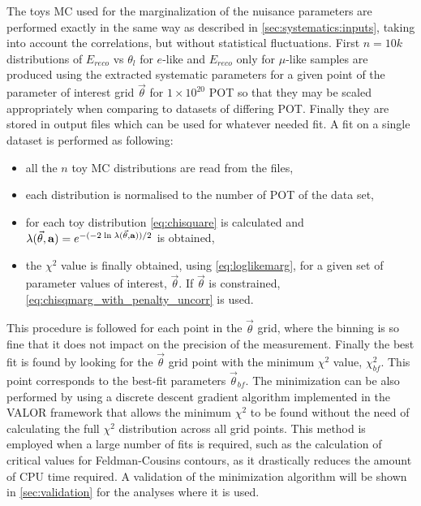 The toys MC used for the marginalization of the nuisance parameters are performed exactly in the same way as 
described in \cref{sec:systematics:inputs}, taking into account the correlations, but without statistical fluctuations.
First $n = 10k$ distributions of $E_{reco}$ vs $\theta_l$ for $e$-like and $E_{reco}$ only for $\mu$-like samples
are produced using the extracted systematic parameters for a given point of the parameter of interest grid $\vec{\theta}$
for $1 \times 10^{20}$ POT so that they may be scaled appropriately when comparing to datasets of differing POT.
Finally they are stored in output files which can be used for whatever needed fit.
A fit on a single dataset is performed as following:
\begin{itemize}
\item all the $n$ toy MC distributions are read from the files,
\item each distribution is normalised to the number of POT of the data set,
\item for each toy distribution \cref{eq:chisquare} is calculated and $\lambda(\vec{\theta},{\bf a}) = e^{- (-2 \; \textrm{ln} \; \lambda (\vec{\theta},{\bf a})) / 2}$ is obtained,
\item the $\chi^2$ value is finally obtained, using \cref{eq:loglikemarg}, for a given set of parameter values of interest, $\vec{\theta}$.
	If $\vec{\theta}$ is constrained, \cref{eq:chisqmarg_with_penalty_uncorr} is used.
\end{itemize}

This procedure is followed for each point in the $\vec{\theta}$ grid, where the binning 
is so fine that it does not impact on the precision of the measurement.
Finally the best fit is found by looking for the $\vec{\theta}$ grid point 
with the minimum $\chi^2$ value, $\chi^2_{bf}$.
This point corresponds to the best-fit parameters $\vec{\theta}_{bf}$. 
The minimization can be also performed by using a discrete descent gradient algorithm \cite{DescentGradient}
implemented in the VALOR framework that allows the minimum $\chi^2$ 
to be found without the need of calculating the full $\chi^2$ distribution across all grid points.
This method is employed when a large number of fits is required, such as the calculation of critical values
for Feldman-Cousins contours, as it drastically reduces the amount of CPU time required.
A validation of the minimization algorithm will be shown in \cref{sec:validation} %
for the analyses where it is used.


